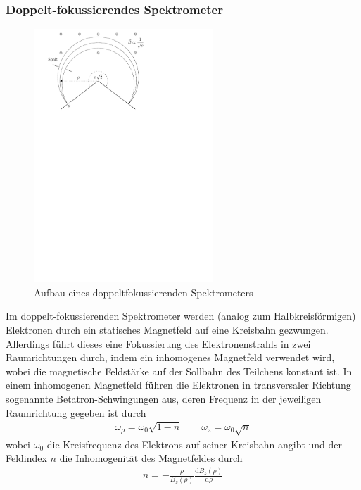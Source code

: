 \documentclass[11pt, a4paper]{article}
\numberwithin{equation}{section}
\begin{document}
\subsubsection{Doppelt-fokussierendes Spektrometer}
\begin{figure}[h]
	\centering
	\includegraphics[width=0.6\textwidth]{./figures/pisqrt2_spectrometer.pdf}
	\caption{Aufbau eines doppeltfokussierenden Spektrometers}
	\label{fig:pisqrt2_spectro}
\end{figure}
\noindent Im doppelt-fokussierenden Spektrometer werden (analog zum Halbkreisförmigen) Elektronen durch ein statisches Magnetfeld auf eine Kreisbahn gezwungen.
Allerdings führt dieses eine Fokussierung des Elektronenstrahls in zwei Raumrichtungen durch, indem ein inhomogenes Magnetfeld verwendet wird, wobei die magnetische Feldstärke auf der Sollbahn des Teilchens konstant ist.
In einem inhomogenen Magnetfeld führen die Elektronen in transversaler Richtung sogenannte Betatron-Schwingungen aus, deren Frequenz in der jeweiligen Raumrichtung gegeben ist durch \cite{hillert}
\begin{align}
	\omega_\rho = \omega_0 \sqrt{1-n} \qquad \omega_z = \omega_0 \sqrt{n}
\end{align}
wobei $\omega_0$ die Kreisfrequenz des Elektrons auf seiner Kreisbahn angibt und der Feldindex $n$ die Inhomogenität des Magnetfeldes durch
\begin{align}
	n = - \frac{\rho}{B_z(\rho)} \frac{\mathrm{d} B_z(\rho)}{\mathrm{d} \rho}
\end{align}
\end{document}
